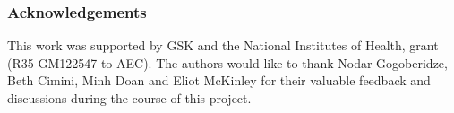 \documentclass{article}
\begin{document}
\subsubsection{Acknowledgements}
\label{sec:acknowledgements}

This work was supported by GSK and the National Institutes of Health, grant (R35 GM122547 to AEC). The authors would like to thank Nodar Gogoberidze, Beth Cimini, Minh Doan and Eliot McKinley for their valuable feedback and discussions during the course of this project.
\end{document}
